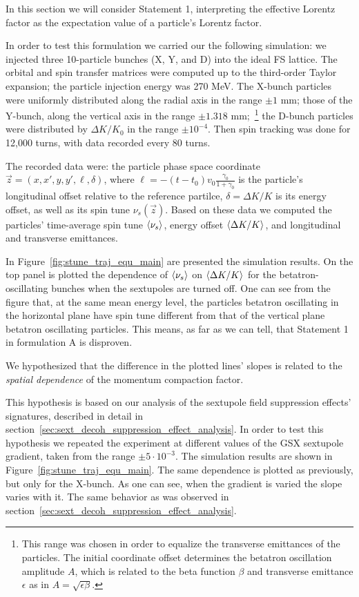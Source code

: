 
In this section we will consider Statement 1, interpreting the effective Lorentz factor as the expectation value
of a particle's Lorentz factor.

In order to test this formulation we carried our the following simulation: we injected three 10-particle
bunches (X, Y, and D) into the ideal FS lattice. The orbital and spin transfer matrices were computed
up to the third-order Taylor expansion; the particle injection energy was 270 MeV. The X-bunch particles
were uniformly distributed along the radial axis in the range $\pm 1$ mm; those of the Y-bunch, along the vertical
axis in the range $\pm 1.318$ mm;~\footnote{This range was chosen in order to equalize the transverse
emittances of the particles. The initial coordinate offset determines the betatron oscillation amplitude $A$,
which is related to the beta function $\beta$ and transverse emittance $\epsilon$ as in
$A = \sqrt{\epsilon \beta}$.} the D-bunch particles were distributed by $\Delta K/K_0$ in the range $\pm 10^{-4}$.
Then spin tracking was done for 12,000 turns, with data recorded every 80 turns.

The recorded data were: the particle phase space coordinate $\vec z = (x,x',y,y',\ell, \delta)$, where
$\ell = -(t-t_0)v_0\frac{\gamma_0}{1+\gamma_0}$ is the particle's longitudinal offset relative to the
reference partilce, $\delta = \Delta K/K$ is its energy offset, as well as its spin tune $\nu_s(\vec z)$.
Based on these data we computed the particles' time-average spin tune $\avg{\nu_s}$,
energy offset  $\avg{\Delta K/K}$, and longitudinal and transverse emittances.

In Figure~\ref{fig:stune_traj_equ_main} are presented the simulation results. On the top panel is plotted the
dependence of $\avg{\nu_s}$ on $\avg{\Delta K/K}$ for the betatron-oscillating bunches when the sextupoles
are turned off. One can see from the figure that, at the same mean energy level, the particles betatron
oscillating in the horizontal plane have spin tune different from that of the vertical plane betatron
oscillating particles. This means, as far as we can tell, that Statement 1 in formulation A is disproven.

We hypothesized that the difference in the plotted lines' slopes is related to the
\emph{spatial dependence} of the momentum compaction factor.

This hypothesis is based on our analysis of the sextupole field suppression effects' signatures, described
in detail in section~\ref{sec:sext_decoh_suppression_effect_analysis}. In order to test this hypothesis we
repeated the experiment at different values of the GSX sextupole gradient, taken from
the range $\pm 5\cdot 10^{-3}$. The simulation results are shown in Figure~\ref{fig:stune_traj_equ_main}.
The same dependence is plotted as previously, but only for the X-bunch.
As one can see, when the gradient is varied the slope varies with it. The same behavior as was
observed in section~\ref{sec:sext_decoh_suppression_effect_analysis}.


